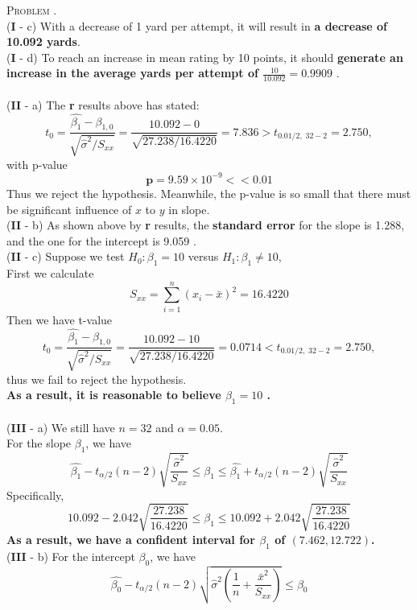 \documentclass[12pt, a4paper, oneside]{article}
\newcounter{problemname}
\newenvironment{problem}{\stepcounter{problemname}\par\noindent\textsc{Problem \arabic{problemname}. }}{\\\par}
\begin{document}
\begin{problem}
    \\
    (\textbf{I} - c) With a decrease of 1 yard per attempt, it will result in \textbf{a decrease of 10.092 yards}.
    \\
    (\textbf{I} - d) To reach an increase in mean rating by 10 points, it should \textbf{generate an increase in the average yards per attempt of 
    \;$\frac{10}{10.092} = 0.9909$} .
    \\ \\
    (\textbf{II} - a) The \textbf{r} results above has stated:
    $$ t_0 = \frac{\hat{\beta_1} - \beta_{1,0}}{\sqrt{\hat{\sigma}^2 / S_{xx}}} 
           = \frac{10.092 - 0}{\sqrt{27.238 / 16.4220}}= 7.836 > t_{0.01/2, \; 32-2} = 2.750,$$
    with p-value $$ \mathbf{p} = 9.59 \times 10^{-9} << 0.01$$
    Thus we reject the hypothesis. Meanwhile, the p-value is so small that there must be significant influence of $x$ to $y$ in slope.
    \\
    (\textbf{II} - b) As shown above by \textbf{r} results, the \textbf{standard error} for the slope is 1.288, and the one for the intercept is 9.059 .
    \\
    (\textbf{II} - c) Suppose we test $H_0: \beta_1 = 10$ versus $H_1: \beta_1 \neq 10$, \\
    First we calculate $$ S_{xx} = \sum_{i=1}^{n} (x_i-\bar{x})^2 = 16.4220$$
    Then we have t-value $$ t_0 = \frac{\hat{\beta_1} - \beta_{1,0}}{\sqrt{\hat{\sigma}^2 / S_{xx}}} 
                                = \frac{10.092 - 10}{\sqrt{27.238 / 16.4220}} = 0.0714 < t_{0.01/2, \; 32-2} = 2.750,$$
    thus we fail to reject the hypothesis.\\
    \textbf{As a result, it is reasonable to believe $\beta_1 = 10$ .}
    \\ \\
    (\textbf{III} - a) We still have $n = 32$ and  $\alpha =0.05$. \\
    For the slope $\beta_1$, we have
    $$ \hat{\beta_1} - t_{\alpha/2}(n-2)\sqrt{\frac{\hat{\sigma}^2}{S_{xx}}} \leq \beta_1 
            \leq \hat{\beta_1} + t_{\alpha/2}(n-2)\sqrt{\frac{\hat{\sigma}^2}{S_{xx}}}$$
    Specifically,
    $$ 10.092 - 2.042\sqrt{\frac{27.238}{16.4220}} \leq \beta_1 \leq 10.092 + 2.042\sqrt{\frac{27.238}{16.4220}}$$
    \textbf{As a result, we have a confident interval for $\beta_1$ of $\mathbf{(7.462, 12.722)}$.}
    \\
    (\textbf{III} - b) For the intercept $\beta_0$, we have
    $$ \hat{\beta_0} - t_{\alpha/2}(n-2)\sqrt{\hat{\sigma}^2 (\frac{1}{n}+\frac{\bar{x}^2}{S_{xx}})} \leq \beta_0
$$
\end{problem}
\end{document}
